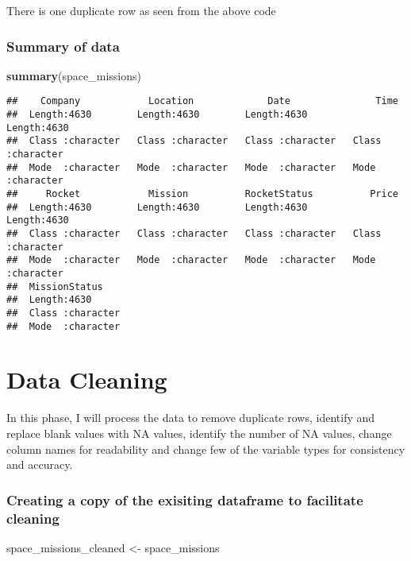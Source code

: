 \documentclass[
]{article}
\newenvironment{Shaded}{\begin{snugshade}}{\end{snugshade}}
\newcommand{\FunctionTok}[1]{\textcolor[rgb]{0.13,0.29,0.53}{\textbf{#1}}}
\newcommand{\NormalTok}[1]{#1}
\newcommand{\OtherTok}[1]{\textcolor[rgb]{0.56,0.35,0.01}{#1}}
\begin{document}
There is one duplicate row as seen from the above code

\hypertarget{summary-of-data}{%
\subsubsection{Summary of data}\label{summary-of-data}}

\begin{Shaded}
\begin{Highlighting}[]
\FunctionTok{summary}\NormalTok{(space\_missions)}
\end{Highlighting}
\end{Shaded}

\begin{verbatim}
##    Company            Location             Date               Time          
##  Length:4630        Length:4630        Length:4630        Length:4630       
##  Class :character   Class :character   Class :character   Class :character  
##  Mode  :character   Mode  :character   Mode  :character   Mode  :character  
##     Rocket            Mission          RocketStatus          Price          
##  Length:4630        Length:4630        Length:4630        Length:4630       
##  Class :character   Class :character   Class :character   Class :character  
##  Mode  :character   Mode  :character   Mode  :character   Mode  :character  
##  MissionStatus     
##  Length:4630       
##  Class :character  
##  Mode  :character
\end{verbatim}

\hypertarget{data-cleaning}{%
\section{Data Cleaning}\label{data-cleaning}}

In this phase, I will process the data to remove duplicate rows,
identify and replace blank values with NA values, identify the number of
NA values, change column names for readability and change few of the
variable types for consistency and accuracy.

\hypertarget{creating-a-copy-of-the-exisiting-dataframe-to-facilitate-cleaning}{%
\subsubsection{Creating a copy of the exisiting dataframe to facilitate
cleaning}\label{creating-a-copy-of-the-exisiting-dataframe-to-facilitate-cleaning}}

\begin{Shaded}
\begin{Highlighting}[]
\NormalTok{space\_missions\_cleaned }\OtherTok{\textless{}{-}}\NormalTok{ space\_missions}
\end{Highlighting}
\end{Shaded}
\end{document}
